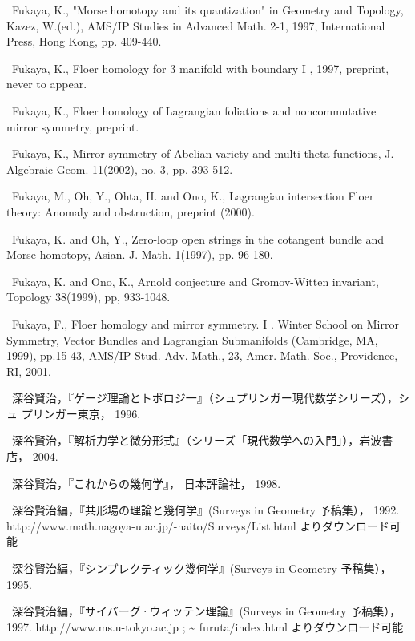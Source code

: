 {\noindent [118]\ Fukaya, K., "Morse homotopy and its quantization" in Geometry and Topology, Kazez, W.(ed.), AMS/IP Studies in Advanced Math. 2-1, 1997, International Press, Hong Kong, pp. 409-440.\par\smallskip
\noindent [119]\ Fukaya, K., Floer homology for 3 manifold with boundary I , 1997, preprint, never to appear.\par\smallskip
\noindent [120]\ Fukaya, K., Floer homology of Lagrangian foliations and noncommutative mirror symmetry, preprint.\par\smallskip
\noindent [121]\ Fukaya, K., Mirror symmetry of Abelian variety and multi theta functions, J. Algebraic Geom. 11(2002), no. 3, pp. 393-512.\par\smallskip
\noindent [122]\ Fukaya, M., Oh, Y., Ohta, H. and Ono, K., Lagrangian intersection Floer theory: Anomaly and obstruction, preprint (2000).\par\smallskip
\noindent [123]\ Fukaya, K. and Oh, Y., Zero-loop open strings in the cotangent bundle and Morse homotopy, Asian. J. Math. 1(1997), pp. 96-180.\par\smallskip
\noindent [124]\ Fukaya, K. and Ono, K., Arnold conjecture and Gromov-Witten invariant, Topology 38(1999), pp, 933-1048.\par\smallskip
\noindent [125]\ Fukaya, F., Floer homology and mirror symmetry. I . Winter School on Mirror Symmetry, Vector Bundles and Lagrangian Submanifolds (Cambridge, MA, 1999), pp.15-43, AMS/IP Stud. Adv. Math., 23, Amer. Math. Soc., Providence, RI, 2001.\par\smallskip
\noindent [126]\ 深谷賢治，『ゲージ理論とトポロジ一』（シュプリンガー現代数学シリーズ），シュ プリンガー東京， 1996.\par\smallskip
\noindent [127]\ 深谷賢治，『解析力学と微分形式』（シリーズ「現代数学への入門」），岩波書店， 2004.\par\smallskip
\noindent [128]\ 深谷賢治，『これからの幾何学』， 日本評論社， 1998.\par\smallskip
\noindent [129]\ 深谷賢治編，『共形場の理論と幾何学』(Surveys in Geometry 予稿集）， 1992. http://www.math.nagoya-u.ac.jp/-naito/Surveys/List.html よりダウンロード可能\par\smallskip
\noindent [130]\ 深谷賢治編，『シンプレクティック幾何学』(Surveys in Geometry 予稿集）， 1995.\par\smallskip
\noindent [131]\ 深谷賢治編，『サイバーグ·ウィッテン理論』(Surveys in Geometry 予稿集）， 1997. http://www.ms.u-tokyo.ac.jp ; \textasciitilde{} furuta/index.html よりダウンロード可能\par\smallskip
}
